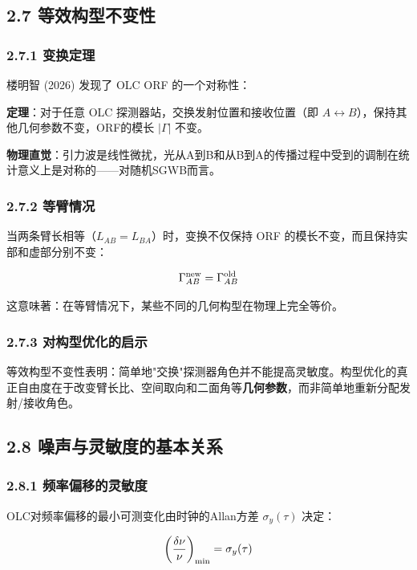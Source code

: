 \documentclass[12pt,a4paper]{article}
\begin{document}
\subsection{2.7 等效构型不变性}


\subsubsection{2.7.1 变换定理}


楼明智 (2026) 发现了 OLC ORF 的一个对称性：

\textbf{定理}：对于任意 OLC 探测器站，交换发射位置和接收位置（即 $A \leftrightarrow B$），保持其他几何参数不变，ORF的模长 $|\Gamma|$ 不变。

\textbf{物理直觉}：引力波是线性微扰，光从A到B和从B到A的传播过程中受到的调制在统计意义上是对称的——对随机SGWB而言。

\subsubsection{2.7.2 等臂情况}


当两条臂长相等（$L_{AB} = L_{BA}$）时，变换不仅保持 ORF 的模长不变，而且保持实部和虚部分别不变：

$$\Gamma_{AB}^{\rm new} = \Gamma_{AB}^{\rm old}$$

这意味著：在等臂情况下，某些不同的几何构型在物理上完全等价。

\subsubsection{2.7.3 对构型优化的启示}


等效构型不变性表明：简单地"交换"探测器角色并不能提高灵敏度。构型优化的真正自由度在于改变臂长比、空间取向和二面角等\textbf{几何参数}，而非简单地重新分配发射/接收角色。

\subsection{2.8 噪声与灵敏度的基本关系}


\subsubsection{2.8.1 频率偏移的灵敏度}


OLC对频率偏移的最小可测变化由时钟的Allan方差 $\sigma_y(\tau)$ 决定：

$$\left(\frac{\delta\nu}{\nu}\right)_{\rm min} = \sigma_y(\tau)$$
\end{document}
